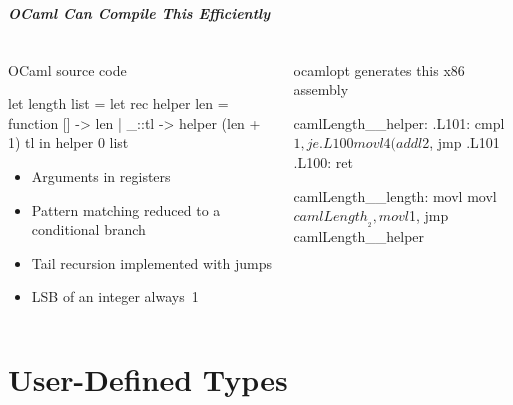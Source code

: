 \documentclass{plt}
\begin{document}
\begin{frame}[fragile]
  \frametitle{OCaml Can Compile This Efficiently}


  \begin{columns}
    \begin{column}[t]{0.5\textwidth}

OCaml source code

\medskip

\begin{ocaml}
let length list =
  let rec helper len = function
      []    -> len
    | _::tl -> helper (len + 1) tl
  in helper 0 list
\end{ocaml}

\begin{itemize}
\item Arguments in registers
\item Pattern matching reduced to a conditional branch
\item Tail recursion implemented with jumps
\item LSB of an integer always~1
\end{itemize}

    \end{column}
    \begin{column}[t]{0.5\textwidth}
ocamlopt generates this x86 assembly

\medskip

\begin{interactive}
\color{black}camlLength__helper:
.L101:
  cmpl  $1, %
  je    .L100
  movl  4(%
  addl  $2, %
  jmp   .L101
.L100:
  ret

camlLength__length:
  movl  %
  movl  $camlLength__2, %
  movl  $1, %
  jmp   camlLength__helper
\end{interactive}    
    \end{column}
  \end{columns}

\end{frame}

\part{User-Defined Types}
\end{document}
